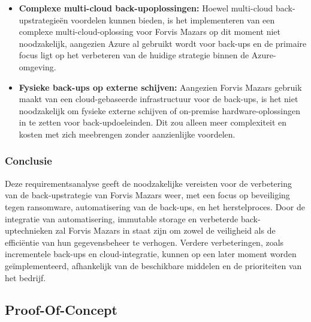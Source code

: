 \begin{itemize}
    \item \textbf{Complexe multi-cloud back-upoplossingen:} Hoewel multi-cloud back-upstrategieën voordelen kunnen bieden, is het implementeren van een complexe multi-cloud-oplossing voor Forvis Mazars op dit moment niet noodzakelijk, aangezien Azure al gebruikt wordt voor back-ups en de primaire focus ligt op het verbeteren van de huidige strategie binnen de Azure-omgeving.
    
    \item \textbf{Fysieke back-ups op externe schijven:} Aangezien Forvis Mazars gebruik maakt van een cloud-gebaseerde infrastructuur voor de back-ups, is het niet noodzakelijk om fysieke externe schijven of on-premise hardware-oplossingen in te zetten voor back-updoeleinden. Dit zou alleen meer complexiteit en kosten met zich meebrengen zonder aanzienlijke voordelen.
\end{itemize}

\subsubsection{Conclusie}
Deze requirementsanalyse geeft de noodzakelijke vereisten voor de verbetering van de back-upstrategie van Forvis Mazars weer, met een focus op beveiliging tegen ransomware, automatisering van de back-ups, en het herstelproces. Door de integratie van automatisering, immutable storage en verbeterde back-uptechnieken zal Forvis Mazars in staat zijn om zowel de veiligheid als de efficiëntie van hun gegevensbeheer te verhogen. Verdere verbeteringen, zoals incrementele back-ups en cloud-integratie, kunnen op een later moment worden geïmplementeerd, afhankelijk van de beschikbare middelen en de prioriteiten van het bedrijf.

\subsection{Proof-Of-Concept}
